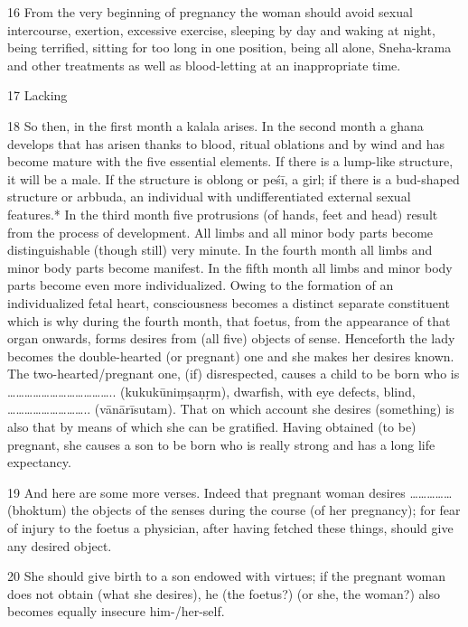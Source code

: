 \begin{translation}
\begin{tt}
\item[16]From the very beginning of pregnancy the woman should avoid sexual 
intercourse, exertion, excessive exercise, sleeping by day and waking at night, 
being terrified, sitting for too long in one position, being all alone, Sneha-krama 
and other treatments as well as blood-letting at an inappropriate time.


\item[17] Lacking

\item[18]So then, in the first month a kalala arises. In the second month a ghana 
develops that has arisen thanks to blood, ritual oblations and by wind and has 
become mature with the five essential elements. If there is a lump-like structure, 
it will be a male. If the structure is oblong or peśī, a girl; if there is a bud-shaped 
structure  or arbbuda, an individual with undifferentiated external sexual 
features.* In the third month five protrusions (of hands, feet and head) result 
from the process of development.  All limbs and all minor body parts become 
distinguishable (though still) very minute. In the fourth month all limbs and minor 
body parts become manifest. In the fifth month all limbs and minor body parts 
become even more individualized. Owing to the formation of an individualized 
fetal heart, consciousness becomes a distinct separate constituent which is why 
during the fourth month, that foetus, from the appearance of that organ onwards, 
forms desires from (all five) objects of sense. Henceforth the lady becomes the 
double-hearted (or pregnant) one and she makes her desires known.  The 
two-hearted/pregnant one, (if) disrespected, causes a child to be born who is  
……………………………….. (kukukūniṃṣaṇṛm),  dwarfish, with eye defects, blind, 
……………………….. (vānārīsutam). That on which account she desires 
(something) is also that by means of which she can be gratified. Having obtained 
(to be) pregnant, she causes a son to be born who is really strong and has a long 
life expectancy. 

\item[19]And here are some more verses. Indeed that pregnant woman desires 
…………… (bhoktum) the objects of the senses during the course (of her 
pregnancy); for fear of injury to the foetus a physician, after having fetched these 
things, should give any desired object.

\item[20]She should give birth to a son endowed with virtues; if the pregnant 
woman does not obtain (what she desires), he (the foetus?) (or she, the woman?) 
also becomes equally insecure him-/her-self.


\end{tt}
\end{translation}
